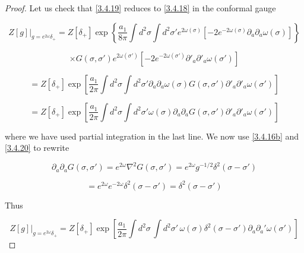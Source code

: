 \begin{tcolorbox}[breakable]
	\begin{proof}
		Let us check that \eqref{3.4.19} reduces to \eqref{3.4.18} in the conformal gauge
		
		\begin{equation}
			Z[g] \bigg|_{g=e^{2\omega} \delta_+} = Z[\delta_+] \exp \left\{ \frac{a_1}{8\pi} \int d^2\sigma \int d^2\sigma' e^{2\omega(\sigma)} \left[ -2e^{-2\omega(\sigma)}\partial_a \partial_a \omega(\sigma) \right] \right\}
		\end{equation}
		
		\begin{equation}
			\times G(\sigma, \sigma') e^{2\omega(\sigma')} \left[ -2e^{-2\omega(\sigma')} \partial'_a \partial'_a \omega(\sigma') \right]
		\end{equation}
		
		\begin{equation}
			= Z[\delta_+] \exp \left[ \frac{a_1}{2\pi} \int d^2\sigma \int d^2\sigma' \partial_a \partial_a \omega(\sigma) G(\sigma, \sigma') \partial'_a \partial'_a \omega(\sigma') \right]
		\end{equation}
		
		\begin{equation}
			= Z[\delta_+] \exp \left[ \frac{a_1}{2\pi} \int d^2\sigma \int d^2\sigma' \omega(\sigma) \partial_a \partial_a G(\sigma, \sigma') \partial'_a \partial'_a \omega(\sigma') \right]
		\end{equation}
		
		where we have used partial integration in the last line. We now use \eqref{3.4.16b} and \eqref{3.4.20} to rewrite
		
		\begin{equation}
			\partial_a \partial_a G(\sigma, \sigma') = e^{2\omega} \nabla^2 G(\sigma, \sigma') = e^{2\omega} g^{-1/2} \delta^2(\sigma - \sigma')
		\end{equation}
		
		\begin{equation}
			= e^{2\omega} e^{-2\omega} \delta^2(\sigma - \sigma') = \delta^2(\sigma - \sigma')
		\end{equation}
		
		Thus
		
		\begin{equation}
			Z[g] \bigg|_{g=e^{2\omega} \delta_+} = Z[\delta_+] \exp \left[ \frac{a_1}{2\pi} \int d^2\sigma \, \int d^2\sigma' \, \omega(\sigma) \delta^2(\sigma - \sigma') \partial_a \partial_a' \omega(\sigma') \right]
		\end{equation}
		

\end{proof}
\end{tcolorbox}
